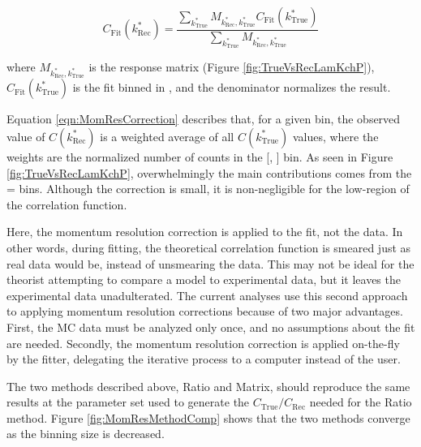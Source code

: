 \documentclass[/home/jesse/Analysis/FemtoAnalysis/AnalysisNotes/AnalysisNoteJBuxton.tex]{subfiles}
\begin{document}
\begin{equation}
  C_{\mathrm{Fit}}(k^{*}_{\mathrm{Rec}}) = \dfrac{\sum\limits_{k^{*}_{\mathrm{True}}}M_{k^{*}_{\mathrm{Rec}},k^{*}_{\mathrm{True}}}C_{\mathrm{Fit}}(k^{*}_{\mathrm{True}})}{\sum\limits_{k^{*}_{\mathrm{True}}}M_{k^{*}_{\mathrm{Rec}},k^{*}_{\mathrm{True}}}}
\label{eqn:MomResCorrection}
\end{equation}

where $M_{k^{*}_{\mathrm{Rec}},k^{*}_{\mathrm{True}}}$ is the response matrix (Figure \ref{fig:TrueVsRecLamKchP}), $C_{\mathrm{Fit}}(k^{*}_{\mathrm{True}})$ is the fit binned in \ktrue, and the denominator normalizes the result.

Equation \ref{eqn:MomResCorrection} describes that, for a given \krec bin, the observed value of $C(k^{*}_{\mathrm{Rec}})$ is a weighted average of all $C(k^{*}_{\mathrm{True}})$ values, where the weights are the normalized number of counts in the [\krec, \ktrue] bin.
As seen in Figure \ref{fig:TrueVsRecLamKchP}, overwhelmingly the main contributions comes from the \krec = \ktrue bins.
Although the correction is small, it is non-negligible for the low-\kstar region of the correlation function.

Here, the momentum resolution correction is applied to the fit, not the data.
In other words, during fitting, the theoretical correlation function is smeared just as real data would be, instead of unsmearing the data.
This may not be ideal for the theorist attempting to compare a model to experimental data, but it leaves the experimental data unadulterated.
The current analyses use this second approach to applying momentum resolution corrections because of two major advantages.  First, the MC data must be analyzed only once, and no assumptions about the fit are needed.  Secondly, the momentum resolution correction is applied on-the-fly by the fitter, delegating the iterative process to a computer instead of the user.

The two methods described above, Ratio and Matrix, should reproduce the same results at the parameter set used to generate the $C_{\mathrm{True}}/C_{\mathrm{Rec}}$ needed for the Ratio method.  Figure \ref{fig:MomResMethodComp} shows that the two methods converge as the binning size is decreased.
\end{document}
